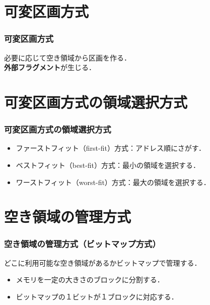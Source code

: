 \documentclass[handout]{beamer}                   %
\begin{document}
\section{可変区画方式}
\begin{frame}
  \frametitle{可変区画方式}
  \vfill
  必要に応じて空き領域から区画を作る．\\
  {\bf 外部フラグメント}が生じる．
\end{frame}

\section{可変区画方式の領域選択方式}
\begin{frame}
  \frametitle{可変区画方式の領域選択方式}
  \begin{itemize}
  \item ファーストフィット（first-fit）方式：アドレス順にさがす．
  \item ベストフィット（best-fit）方式：最小の領域を選択する．
  \item ワーストフィット（worst-fit）方式：最大の領域を選択する．
  \end{itemize}
\end{frame}

\section{空き領域の管理方式}
\begin{frame}
  \frametitle{空き領域の管理方式（ビットマップ方式）}
  どこに利用可能な空き領域があるかビットマップで管理する．
  \vfill
  \begin{itemize}
  \item メモリを一定の大きさのブロックに分割する．
  \item ビットマップの１ビットが１ブロックに対応する．
  \end{itemize}
\end{frame}
\end{document}
